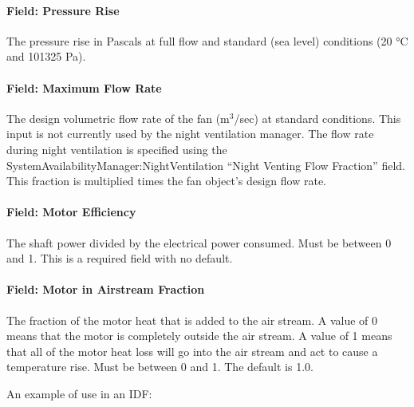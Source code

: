 \paragraph{Field: Pressure Rise}\label{field-pressure-rise-4}

The pressure rise in Pascals at full flow and standard (sea level) conditions (20 °C and 101325 Pa).

\paragraph{Field: Maximum Flow Rate}\label{field-maximum-flow-rate-4}

The design volumetric flow rate of the fan (m\(^{3}\)/sec) at standard conditions. This input is not currently used by the night ventilation manager. The flow rate during night ventilation is specified using the SystemAvailabilityManager:NightVentilation ``Night Venting Flow Fraction'' field. This fraction is multiplied times the fan object's design flow rate.

\paragraph{Field: Motor Efficiency}\label{field-motor-efficiency-3}

The shaft power divided by the electrical power consumed. Must be between 0 and 1. This is a required field with no default.

\paragraph{Field: Motor in Airstream Fraction}\label{field-motor-in-airstream-fraction-3}

The fraction of the motor heat that is added to the air stream. A value of 0 means that the motor is completely outside the air stream. A value of 1 means that all of the motor heat loss will go into the air stream and act to cause a temperature rise. Must be between 0 and 1. The default is 1.0.

An example of use in an IDF:

